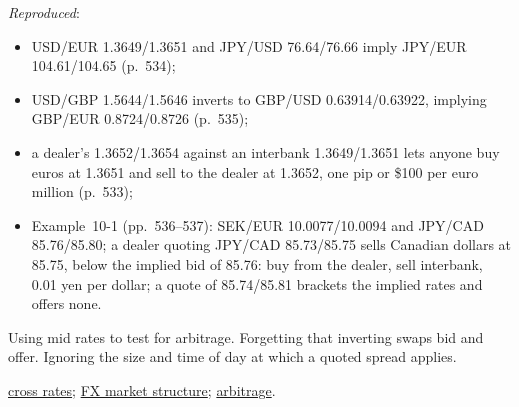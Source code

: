 \begin{qfmethod}
 \emph{Reproduced}:
\begin{itemize}
\item USD/EUR 1.3649/1.3651 and JPY/USD 76.64/76.66 imply JPY/EUR 104.61/104.65 (p.~534);
\item USD/GBP 1.5644/1.5646 inverts to GBP/USD 0.63914/0.63922, implying GBP/EUR 0.8724/0.8726 (p.~535);
\item a dealer's 1.3652/1.3654 against an interbank 1.3649/1.3651 lets anyone buy euros at 1.3651 and sell to the dealer at 1.3652, one pip or \$100 per euro million (p.~533);
\item Example~10-1 (pp.~536--537): SEK/EUR 10.0077/10.0094 and JPY/CAD 85.76/85.80; a dealer quoting JPY/CAD 85.73/85.75 sells Canadian dollars at 85.75, below the implied bid of 85.76: buy from the dealer, sell interbank, 0.01 yen per dollar; a quote of 85.74/85.81 brackets the implied rates and offers none.
\end{itemize}

 Using mid rates to test for arbitrage. Forgetting that inverting swaps bid and offer. Ignoring the size and time of day at which a quoted spread applies.

 \hyperref[meth:cross-forward-rates]{cross rates}; \hyperref[def:fx-market-structure]{FX market structure}; \hyperref[def:arbitrage]{arbitrage}.

\end{qfmethod}

